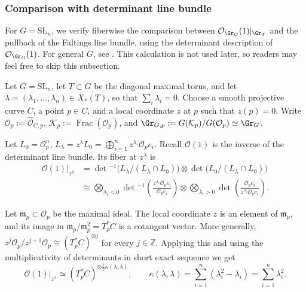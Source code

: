 \documentclass{amsart}
\numberwithin{equation}{section}
\numberwithin{figure}{section}
\theoremstyle{definition}
\theoremstyle{remark}
\renewcommand{\c}[1]{\mathcal{#1}}
\renewcommand{\b}[1]{\mathbb{#1}}
\newcommand{\f}[1]{\mathfrak{#1}}
\renewcommand{\r}[1]{\mathrm{#1}}
\newcommand{\SL}{\r{SL}}
\begin{document}
\subsubsection{Comparison with determinant line bundle}
For $G=\SL_n$, we verify fiberwise the comparison between
$\c O_{\Gr_G}(1)|_{\Gr_T}$ and the pullback of the Faltings
line bundle, using the determinant description of
$\c O_{\Gr_G}(1)$. For general $G$, see
\cite[Remark 2.4.3]{zhu2016introduction}.
This calculation is not used later, so readers may feel free to skip
this subsection.


Let $G=\SL_n$, let $T\subset G$ be the diagonal maximal torus, and let 	$\lambda=(\lambda_1,\ldots,\lambda_n)\in X_*(T)$, so that	$\sum_i\lambda_i=0$.
	Choose a smooth projective curve $C$, a point $p\in C$, and a local 	coordinate $z$ at $p$ such that $z(p)=0$. Write 	$\c O_p:=\widehat{\c O}_{C,p}$, $\c K_p:=\operatorname{Frac}(\c O_p)$, and $\Gr_{G,p}:=G(\c K_p)/G(\c O_p)\simeq\Gr_G$.
	
	Let $L_0=\c O_p^n$, $L_\lambda=z^\lambda L_0
	=\bigoplus_{i=1}^n z^{\lambda_i}\c O_pe_i.$
	Recall $\c O(1)$ is the inverse of the 
	determinant line bundle. Its fiber at $z^\lambda$ is 
	\[
	\begin{aligned}
		\left.\c O(1)\right|_{z^\lambda}
		&=
		\det\!^{-1}\bigl(L_\lambda/(L_\lambda\cap L_0)\bigr)
		\otimes
		\det\bigl(L_0/(L_\lambda\cap L_0)\bigr) \\
		&\cong
		\bigotimes_{\lambda_i<0}
		\det\!^{-1}\left(\frac{z^{\lambda_i}\c O_pe_i}{\c O_pe_i}\right)
		\otimes
		\bigotimes_{\lambda_i>0}
		\det\left(\frac{\c O_pe_i}{z^{\lambda_i}\c O_pe_i}\right).
	\end{aligned}
	\]
	
	Let $\f m_p\subset\c O_p$ be the maximal ideal. The local coordinate
	$z$ is an element of $\f m_p$, and its image in
	$\f m_p/\f m_p^2= T_p^*C$ is a  cotangent
	vector. More generally, $z^j\c O_p/z^{j+1}\c O_p\cong (T_p^*C)^{\otimes j}$
	for every $j\in\b Z$. Applying this and using the multiplicativity  of determinants in short exact sequence we get
	\[
	\left.\c O(1)\right|_{z^\lambda}
	\simeq
	(T_p^*C)^{\otimes\frac{1}{2}\kappa(\lambda, \lambda)},
	\qquad
	\kappa(\lambda, \lambda)
	=
	\sum_{i=1}^n(\lambda_i^2-\lambda_i)
	=\sum_{i=1}^n\lambda_i^2.
	\]
	
\end{document}
